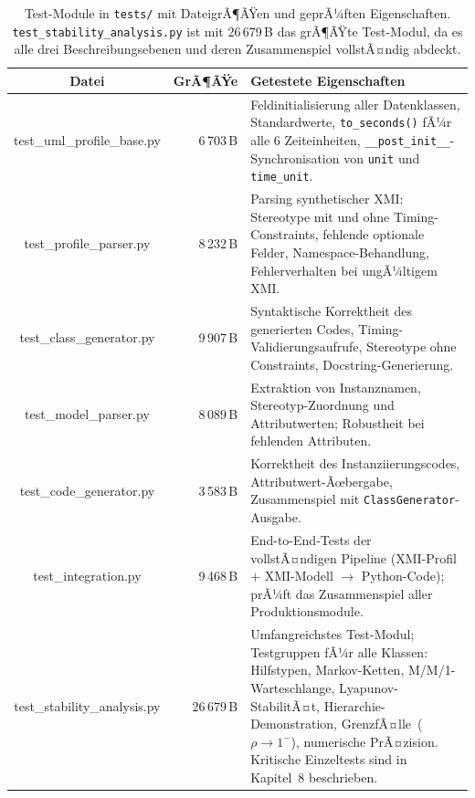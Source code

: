 ﻿\documentclass[a4paper,12pt]{scrreprt}
\theoremstyle{definition}
\begin{document}
\begin{table}[H]
	\small
	\centering
	\renewcommand{\arraystretch}{1.35}
	\begin{tabular}{@{} C r p{6.4cm} @{}}
		\toprule
		\normalfont\textbf{Datei} &
		\textbf{GrÃ¶ÃŸe} &
		\textbf{Getestete Eigenschaften} \\
		\midrule
		test\_uml\_profile\_base.py  & 6\,703\,B &
		Feldinitialisierung aller Datenklassen, Standardwerte,
		\texttt{to\_seconds()} fÃ¼r alle 6 Zeiteinheiten,
		\texttt{\_\_post\_init\_\_}-Synchronisation von
		\texttt{unit} und \texttt{time\_unit}. \\
		
		test\_profile\_parser.py     & 8\,232\,B &
		Parsing synthetischer XMI: Stereotype mit und ohne
		Timing-Constraints, fehlende optionale Felder,
		Namespace-Behandlung, Fehlerverhalten bei ungÃ¼ltigem XMI. \\
		
		test\_class\_generator.py    & 9\,907\,B &
		Syntaktische Korrektheit des generierten Codes,
		Timing-Validierungsaufrufe, Stereotype ohne Constraints,
		Docstring-Generierung. \\
		
		test\_model\_parser.py       & 8\,089\,B &
		Extraktion von Instanznamen, Stereotyp-Zuordnung und
		Attributwerten; Robustheit bei fehlenden Attributen. \\
		
		test\_code\_generator.py     & 3\,583\,B &
		Korrektheit des Instanziierungscodes,
		Attributwert-Ãœbergabe, Zusammenspiel mit
		\texttt{ClassGenerator}-Ausgabe. \\
		
		test\_integration.py         & 9\,468\,B &
		End-to-End-Tests der vollstÃ¤ndigen Pipeline
		(XMI-Profil $+$ XMI-Modell $\to$ Python-Code);
		prÃ¼ft das Zusammenspiel aller Produktionsmodule. \\
		
		test\_stability\_analysis.py & 26\,679\,B &
		Umfangreichstes Test-Modul; Testgruppen fÃ¼r alle Klassen:
		Hilfstypen, Markov-Ketten, M/M/1-Warteschlange,
		Lyapunov-StabilitÃ¤t, Hierarchie-Demonstration,
		GrenzfÃ¤lle~($\rho \to 1^{-}$), numerische PrÃ¤zision.
		Kritische Einzeltests sind in Kapitel~8 beschrieben. \\
		\bottomrule
	\end{tabular}
	\caption{Test-Module in \texttt{tests/} mit DateigrÃ¶ÃŸen und
		geprÃ¼ften Eigenschaften.
		\texttt{test\_stability\_analysis.py} ist mit 26\,679\,B
		das grÃ¶ÃŸte Test-Modul, da es alle drei Beschreibungsebenen
		und deren Zusammenspiel vollstÃ¤ndig abdeckt.}
	\label{tab:module-tests}
\end{table}
\end{document}
